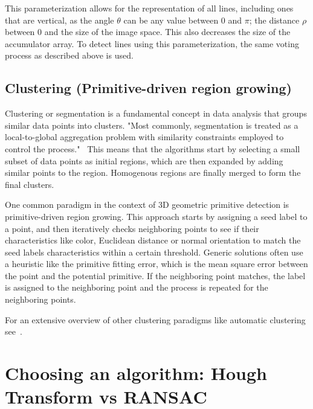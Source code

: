 This parameterization allows for the representation of all lines, including ones that are vertical,
as the angle $\theta$ can be any value between $0$ and $\pi$; the distance $\rho$ between $0$ and the size of the image space.
This also decreases the size of the accumulator array.
To detect lines using this parameterization, the same voting process as described above is used.


\subsection{Clustering (Primitive-driven region growing)}
Clustering or segmentation is a fundamental concept in data analysis that groups similar data points into clusters.
"Most commonly, segmentation is treated as a local-to-global aggregation problem with similarity constraints employed to control the process."~\parencite{lukacs_faithful_1998}
This means that the algorithms start by selecting a small subset of data points as initial regions, which are then expanded by adding similar points to the region.
Homogenous regions are finally merged to form the final clusters.~\parencite{lukacs_faithful_1998}

One common paradigm in the context of 3D geometric primitive detection is primitive-driven region growing.
This approach starts by assigning a seed label to a point, and then iteratively checks neighboring points to see if
their characteristics like color, Euclidean distance or normal orientation to match the seed labels characteristics within a certain threshold.
Generic solutions often use a heuristic like the primitive fitting error, which is the mean square error between the point and the potential primitive.
If the neighboring point matches, the label is assigned to the neighboring point and the process is repeated for the neighboring points.
\cite{kaiser_survey_2019}

For an extensive overview of other clustering paradigms like automatic clustering see~\cite{kaiser_survey_2019}.

\section{Choosing an algorithm: Hough Transform vs RANSAC}\label{sec:choosing-an-algorithm}

